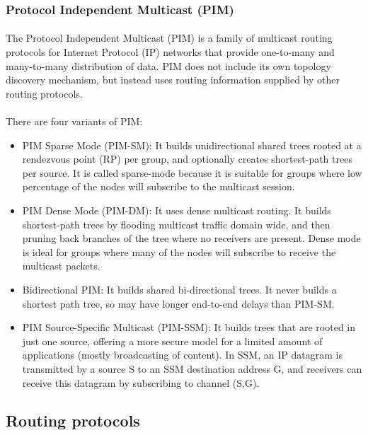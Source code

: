\documentclass[12pt,a4paper]{report}
\begin{document}
\subsubsection{Protocol Independent Multicast (PIM)\cite{PIMSM}\cite{PIMDM}}
\paragraph{}The Protocol Independent Multicast (PIM) is a family of multicast routing protocols for Internet Protocol (IP) networks that provide one-to-many and many-to-many distribution of data. PIM does not include its own topology discovery mechanism, but instead uses routing information supplied by other routing protocols.
\paragraph{}There are four variants of PIM:
\begin{itemize}
\item PIM Sparse Mode (PIM-SM): It builds unidirectional shared trees rooted at a rendezvous point (RP) per group, and optionally creates shortest-path trees per source. It is called sparse-mode because it is suitable for groups where low percentage of the nodes will subscribe to the multicast session.
\item PIM Dense Mode (PIM-DM): It uses dense multicast routing. It builds shortest-path trees by flooding multicast traffic domain wide, and then pruning back branches of the tree where no receivers are present. Dense mode is ideal for groups where many of the nodes will subscribe to receive the multicast packets.
\item Bidirectional PIM: It builds shared bi-directional trees. It never builds a shortest path tree, so may have longer end-to-end delays than PIM-SM.
\item PIM Source-Specific Multicast (PIM-SSM): It builds trees that are rooted in just one source, offering a more secure model for a limited amount of applications (mostly broadcasting of content). In SSM, an IP datagram is transmitted by a source S to an SSM destination address G, and receivers can receive this datagram by subscribing to channel (S,G).
\end{itemize}

\subsection{Routing protocols}
\end{document}
